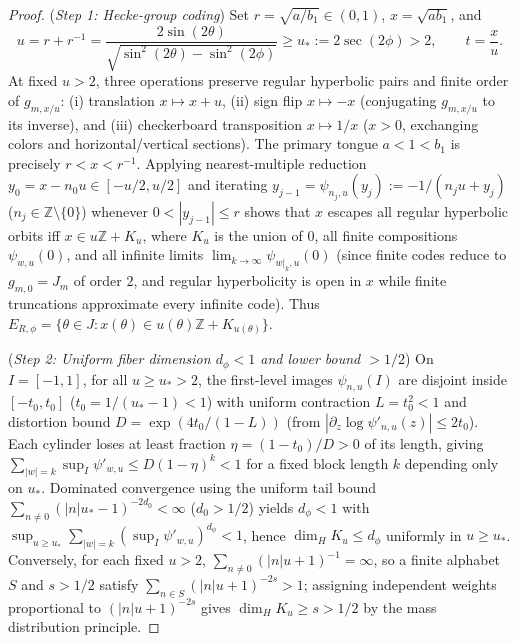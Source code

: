 \documentclass[11pt,reqno]{amsart}
\theoremstyle{definition}
\theoremstyle{remark}
\newcommand{\Z}{\mathbb{Z}}
\begin{document}
\begin{proof}
(\emph{Step 1: Hecke-group coding}) Set $r = \sqrt{a/b_1} \in (0,1)$, $x = \sqrt{ab_1}$, and
\[
  u = r + r^{-1} = \frac{2\sin(2\theta)}{\sqrt{\sin^2(2\theta) - \sin^2(2\phi)}} \ge u_* := 2\sec(2\phi) > 2, \qquad t = \frac{x}{u}.
\]
At fixed $u > 2$, three operations preserve regular hyperbolic pairs and finite order of $g_{m,x/u}$: (i) translation $x \mapsto x + u$, (ii) sign flip $x \mapsto -x$ (conjugating $g_{m,x/u}$ to its inverse), and (iii) checkerboard transposition $x \mapsto 1/x$ ($x > 0$, exchanging colors and horizontal/vertical sections). The primary tongue $a < 1 < b_1$ is precisely $r < x < r^{-1}$. Applying nearest-multiple reduction $y_0 = x - n_0 u \in [-u/2, u/2]$ and iterating $y_{j-1} = \psi_{n_j, u}(y_j) := -1/(n_j u + y_j)$ ($n_j \in \Z \setminus \{0\}$) whenever $0 < |y_{j-1}| \le r$ shows that $x$ escapes all regular hyperbolic orbits iff $x \in u\Z + K_u$, where $K_u$ is the union of $0$, all finite compositions $\psi_{w,u}(0)$, and all infinite limits $\lim_{k\to\infty}\psi_{w|_k, u}(0)$ (since finite codes reduce to $g_{m,0} = J_m$ of order $2$, and regular hyperbolicity is open in $x$ while finite truncations approximate every infinite code). Thus $E_{R,\phi} = \{\theta \in J : x(\theta) \in u(\theta)\Z + K_{u(\theta)}\}$.

(\emph{Step 2: Uniform fiber dimension $d_\phi < 1$ and lower bound $> 1/2$}) On $I = [-1,1]$, for all $u \ge u_* > 2$, the first-level images $\psi_{n,u}(I)$ are disjoint inside $[-t_0, t_0]$ ($t_0 = 1/(u_*-1) < 1$) with uniform contraction $L = t_0^2 < 1$ and distortion bound $D = \exp(4t_0/(1-L))$ (from $|\partial_z \log \psi'_{n,u}(z)| \le 2t_0$). Each cylinder loses at least fraction $\eta = (1-t_0)/D > 0$ of its length, giving $\sum_{|w|=k} \sup_I \psi'_{w,u} \le D(1-\eta)^k < 1$ for a fixed block length $k$ depending only on $u_*$. Dominated convergence using the uniform tail bound $\sum_{n\ne 0}(|n|u_*-1)^{-2d_0} < \infty$ ($d_0 > 1/2$) yields $d_\phi < 1$ with $\sup_{u \ge u_*} \sum_{|w|=k} (\sup_I \psi'_{w,u})^{d_\phi} < 1$, hence $\dim_H K_u \le d_\phi$ uniformly in $u \ge u_*$. Conversely, for each fixed $u > 2$, $\sum_{n\ne 0} (|n|u+1)^{-1} = \infty$, so a finite alphabet $S$ and $s > 1/2$ satisfy $\sum_{n\in S} (|n|u+1)^{-2s} > 1$; assigning independent weights proportional to $(|n|u+1)^{-2s}$ gives $\dim_H K_u \ge s > 1/2$ by the mass distribution principle.


\end{proof}
\end{document}
